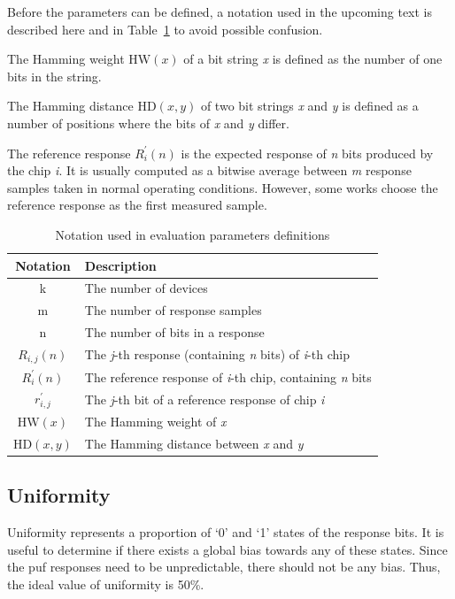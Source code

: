 Before the parameters can be defined, a notation used in the upcoming text is described here and in Table~\ref{table:notation} to avoid possible confusion.

The Hamming weight $\textrm{HW}(x)$ of a bit string \emph{x} is defined as the number of one bits in the string. 

The Hamming distance $\textrm{HD}(x, y)$ of two bit strings \emph{x} and \emph{y} is defined as a number of positions where the bits of \emph{x} and \emph{y} differ.

The reference response $R_{i}^{'}(n)$ is the expected response of \emph{n} bits produced by the chip \emph{i}. It is usually computed as a bitwise average between \emph{m} response samples taken in normal operating conditions. However, some works choose the reference response as the first measured sample.~\cite{Kodytek2020}

\begin{table}[h!]
\centering
\begin{tabular}{c l} 
    \textbf{Notation} & \textbf{Description}\\
     \toprule
     k & The number of devices\\ 
     m & The number of response samples\\
     n & The number of bits in a response\\ 
     $R_{i,j}(n)$ & The \emph{j}-th response (containing \emph{n} bits) of \emph{i}-th chip\\ 
     $R_{i}^{'}(n)$ & The reference response of \emph{i}-th chip, containing \emph{n} bits\\ 
     $r_{i,j}^{'}$ & The \emph{j}-th bit of a reference response of chip \emph{i}\\
     $\textrm{HW}(x)$ & The Hamming weight of \emph{x}\\
     $\textrm{HD}(x, y)$ & The Hamming distance between \emph{x} and \emph{y}\\
     \bottomrule
    \end{tabular}
    \captionsetup{justification=centering,margin=0.5cm}
    \caption{Notation used in evaluation parameters definitions}
    \label{table:notation}
\end{table}

\subsection{Uniformity}\label{sec:uniformity}

Uniformity represents a proportion of `0' and `1' states of the response bits. It is useful to determine if there exists a global bias towards any of these states. Since the \gls{puf} responses need to be unpredictable, there should not be any bias. Thus, the ideal value of uniformity is 50\%.

